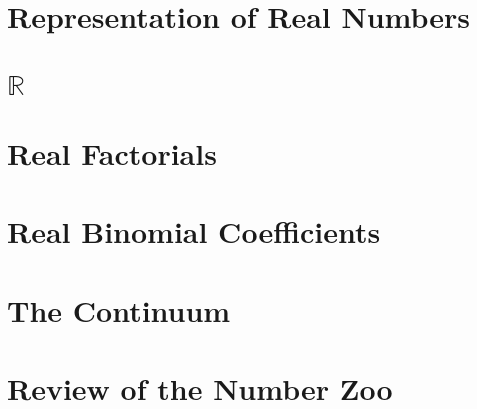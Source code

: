 \documentclass[tikz]{scrreprt}
\begin{document}
\section{Representation of Real Numbers} %
\section{$\mathbb{R}$}
\section{Real Factorials}
\section{Real Binomial Coefficients}
\section{The Continuum}
\section{Review of the Number Zoo}
\end{document}

